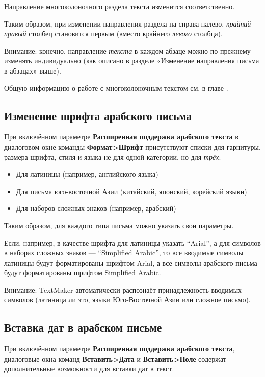 ﻿\documentclass[a4paper,10pt]{article}
\begin{document}
 Направление многоколоночного раздела текста изменится соответственно.
 
 Таким образом, при изменении направления раздела на справа налево, \textit{крайний правый} столбец становится первым (вместо крайнего \textit{левого} столбца).
 
 Внимание: конечно, направление \textit{текста} в каждом абзаце можно по-прежнему изменять индивидуально (как описано в разделе «Изменение направления письма в абзацах» выше).
 
 Общую информацию о работе с многоколоночным текстом см. в главе .
 
 \subsection{Изменение шрифта арабского письма}
 При включённом параметре \textbf{Расширенная поддержка арабского текста} в диалоговом окне команды \textbf{Формат>Шрифт} присутствуют списки для гарнитуры, размера шрифта, стиля и языка не для одной категории, но для \textit{трёх}:
 
 \begin{itemize}
  \item Для латиницы (например, английского языка)
  \item Для письма юго-восточной Азии (китайский, японский, корейский языки)
  \item Для наборов сложных знаков (например, арабский)
 \end{itemize}

 Таким образом, для каждого типа письма можно указать свои параметры.
 
 Если, например, в качестве шрифта для латиницы указать “Arial”, а для символов в наборах сложных знаков — “Simplified Arabic”, то все вводимые символы латиницы будут форматированы шрифтом Arial, а все символы арабского письма будут форматированы шрифтом Simplified Arabic.
 
 Внимание: TextMaker автоматически распознаёт принадлежность вводимых символов (латиница ли это, языки Юго-Восточной Азии или сложное письмо).
 
 \subsection{Вставка дат в арабском письме}
 При включённом параметре \textbf{Расширенная поддержка арабского текста}, диалоговые окна команд \textbf{Вставить>Дата} и  \textbf{Вставить>Поле} содержат дополнительные возможности для вставки дат в текст.
 
\end{document}
